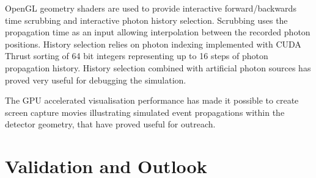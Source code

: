 \documentclass[a4paper]{jpconf}
\begin{document}
OpenGL geometry shaders are used to provide interactive forward/backwards time scrubbing
and interactive photon history selection. Scrubbing uses the propagation time as an input 
allowing interpolation between the recorded photon positions.  
History selection relies on photon indexing implemented with CUDA Thrust 
sorting of 64 bit integers representing up to 16 steps of photon propagation history.   
History selection combined with artificial photon sources has proved 
very useful for debugging the simulation.

The GPU accelerated visualisation performance has made it possible to create 
screen capture movies illustrating simulated event propagations 
within the detector geometry, that have proved useful for outreach. 


\section{Validation and Outlook}

\end{document}
